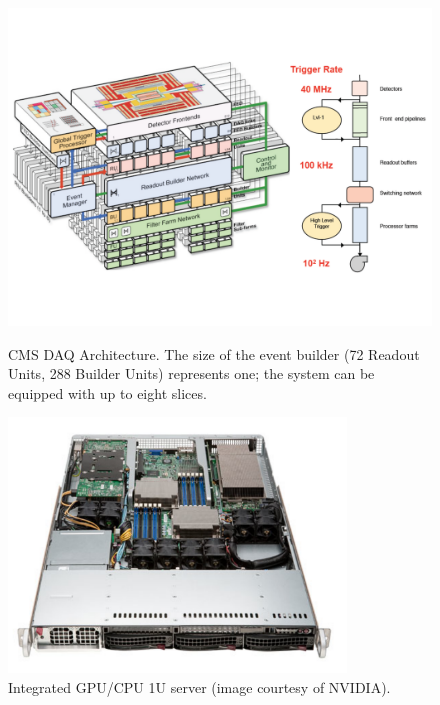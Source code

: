 \documentclass{JINST}
\begin{document}
\begin{figure}[!Hhtb]
\begin{minipage}[t]{8.0cm}
       \begin{center}
	\includegraphics[width=.9\textwidth]{figs/CMSTrigger.pdf}
	\caption{CMS DAQ Architecture. The size  of the event builder (72 Readout
Units, 288  Builder Units) represents one; the  system can be equipped
with up to eight slices. \label{fig:hltarc}}
	\end{center}
\end{minipage}
\begin{minipage}[t]{7.0cm}
\begin{center}
	\includegraphics[width=0.8\textwidth]{figs/Tesla_M1060_1u_Super_Micro_Front_Elevated_no_cover_large.pdf}
	\caption{Integrated GPU/CPU 1U server (image courtesy of NVIDIA).   \label{fig:integratedsys}}
	\end{center}
\end{minipage}
\end{figure}
\end{document}
